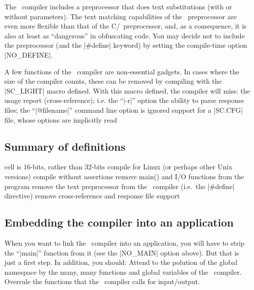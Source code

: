 The \Small\ compiler includes a preprocessor that does text substitutions (with
or without parameters). The text matching capabilities of the \Small\ preprocessor
are even more flexible than that of the C/\Cpp\ preprocessor, and, as a consequence,
it is also at least as ``dangerous'' in obfuscating code. You may decide not to
include the preprocessor (and the |#define| keyword) by setting the compile-time
option |NO_DEFINE|.

A few functions of the \Small\ compiler are non-essential gadgets. In cases where
the size of the compiler counts, these can be removed by compiling with the
|SC_LIGHT| macro defined. With this macro defined, the compiler will miss:
\beginlist{1em}\compactlist
\list{\lbullet}
    the usage report (cross-reference); i.e. the ``|-r|'' option
\list{\lbullet}
    the ability to parse response files; the ``|@filename|'' command line option is ignored
\list{\lbullet}
    support for a |SC.CFG| file, whose options are implicitly read
\endlist


\subsection{Summary of definitions}
\beginlist{100pt} \compactlist
{}
    cell is 16-bits, rather than 32-bits
    compile for Linux (or perhaps other Unix versions)
    compile without assertions
    remove main() and I/O functions from the program
    remove the text preprocessor from the \Small\ compiler (i.e.\ the |#define| directive)
    remove cross-reference and response file support
\endlist

\subsection{Embedding the compiler into an application}
When you want to link the \Small\ compiler into an application, you will have
to strip the ``|main|'' function from it (see the |NO_MAIN| option above). But
that is just a first step. In addition, you should:
\beginlist{1em}\compactlist
\list{\lbullet}
    Attend to the polution of the global namespace by the many, many functions
    and global variables of the \Small\ compiler.
\list{\lbullet}
    Overrule the functions that the \Small\ compiler calls for input/output.
\endlist

